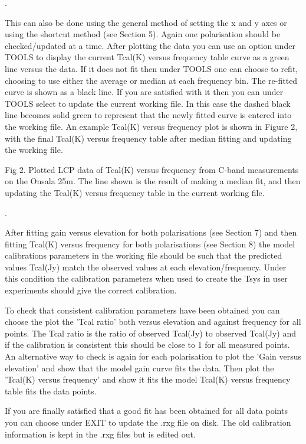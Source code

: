 \vskip 0.5cm

.

   This can also be done using the general method of setting the x and 
 y axes or using the shortcut method (see Section 5). Again one polarisation 
should be checked/updated at a time. After plotting the data you can use an
 option  under TOOLS to display the current Tcal(K) versus frequency table curve as a green 
line  versus the data. If it does not fit then under TOOLS one can choose
to refit, choosing to use either the average or median at each frequency bin. The
 re-fitted curve  is shown as a  black line. If you are satisfied with it 
then you can under TOOLS select to update the current working file. In this 
case the dashed black line becomes solid green to represent that the newly fitted 
curve is entered into the working file. An example Tcal(K) versus 
frequency plot is shown in Figure 2, with the final Tcal(K) versus frequency 
table  after median fitting and updating the working file. 



\centerline{}
\vskip 0.3cm
\noindent Fig 2. Plotted LCP data of Tcal(K) versus frequency from 
C-band measurements on the Onsala 25m. The line shown is the result of
making a median fit, and then updating the Tcal(K) versus frequency table
in the current working file.

\vskip 0.5cm

.

After fitting gain versus elevation for both polarisations (see Section 7) 
and then fitting Tcal(K) versus frequency for both polarisations (see Section
8) the  model calibrations parameters in the working file should be such 
that the predicted values Tcal(Jy) match the observed values 
at each elevation/frequency. Under this condition the calibration
parameters when used to create the Tsys in user experiments should give 
the correct calibration.

To check that consistent calibration parameters have been obtained  
you can choose the plot the 'Tcal ratio' both versus elevation and against 
frequency for all points. The 
Tcal ratio is the ratio of observed Tcal(Jy) to observed 
Tcal(Jy) and if the calibration is consistent this should be close to 
1 for all measured points. An alternative way to check is again for each 
polarisation to plot the 'Gain versus elevation' and show that the model gain
curve fits the data. Then  plot the 'Tcal(K) versus frequency' and show it
fits the model Tcal(K) versus frequency table fits the data points.
 
If you are finally satisfied that a good fit has been obtained 
for all data points you  can choose under EXIT to update the .rxg file on 
disk. The old  calibration information is kept in the .rxg files but is 
edited out. 

  



     









